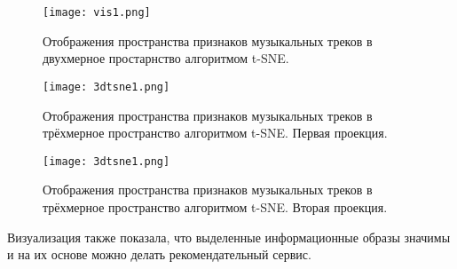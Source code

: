 \begin{figure}[h]
\centering
  \texttt{[image: vis1.png]}
  \caption{Отображения пространства  признаков музыкальных треков в двухмерное простарнство алгоритмом t-SNE.}
  \label{fig:results:2dtsne}
\end{figure}

\begin{figure}[h]
\centering
  \texttt{[image: 3dtsne1.png]}
  \caption{Отображения пространства  признаков музыкальных треков в трёхмерное пространство алгоритмом t-SNE. Первая проекция. }
  \label{fig:results:2dtsne}
\end{figure}


\begin{figure}[h]
\centering
  \texttt{[image: 3dtsne1.png]}
  \caption{Отображения пространства  признаков музыкальных треков в трёхмерное пространство алгоритмом t-SNE. Вторая проекция. }
  \label{fig:results:2dtsne}
\end{figure}

Визуализация также показала, что выделенные информационные образы значимы и на их основе можно делать рекомендательный сервис. 